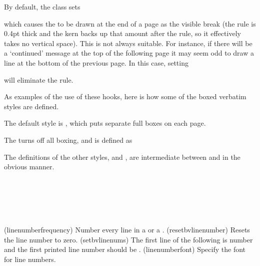 {{{{By default, the class sets
\begin{lcode}
\bvendofpage{\hrule\kern-.4pt}
\end{lcode}
which causes the \cmd{\hrule} to be drawn at the end of a page as the
visible break (the rule is 0.4pt thick and the kern backs up
that amount after the rule, so it effectively takes no vertical space).
This is not always suitable. For instance, if there will be
a `continued' message at the top of the following page it may seem odd
to draw a line at the bottom of the previous page. In this case, setting
\begin{lcode}
\bvendofpage{}
\end{lcode}
will eliminate the rule.

As examples of the use of
these hooks, here is how some of the boxed verbatim styles are defined.

The default style is \cmd{\bvbox}, 
which puts separate full boxes on each page. 
\begin{lcode}
\newcommand{\bvbox}{%
  \bvperpagetrue
  \renewcommand{\bvtoprulehook}{\hrule \nobreak \vskip-.1pt}%
  \renewcommand{\bvleftsidehook}{\vrule}%
  \renewcommand{\bvrightsidehook}{\vrule}%
  \renewcommand{\bvendrulehook}{\hrule}%
  \renewcommand{\bvtopmidhook}{\rule{0pt}{2\fboxsep} \hss}%
}
\end{lcode}
The \cmd{\nobvbox} turns off all boxing, and is defined as
\begin{lcode}
\newcommand{\nobvbox}{%
  \bvperpagefalse
  \renewcommand{\bvtoprulehook}{}%
  \renewcommand{\bvleftsidehook}{}%
  \renewcommand{\bvrightsidehook}{}%
  \renewcommand{\bvendrulehook}{}%
  \renewcommand{\bvtopmidhook}{\rule{0pt}{2\fboxsep} \hss}%
}
\end{lcode}
The definitions of the other styles, \cmd{\bvtopandtail} and \cmd{\bvsides},
are intermediate between \cmd{\bvbox} and \cmd{\nobvbox} in the obvious
manner.


\begin{syntax}
\cmd{\linenumberfrequency} \\
\cmd{\resetbvlinenumber} \\
\cmd{\setbvlinenums} \\
\cmd{\linenumberfont} \\
\end{syntax}
\glossary(linenumberfrequency)%
  {}%
  {Number every  line in a  or a .}
\glossary(resetbvlinenumber)%
  {}%
  {Resets the  line number to zero.}
\glossary(setbvlinenums)%
  {}%
  {The first line of the following  is number  
   and the
   first printed line number should be .}
\glossary(linenumberfont)%
  {}%
  {Specify the font for line numbers.}

}}}}
